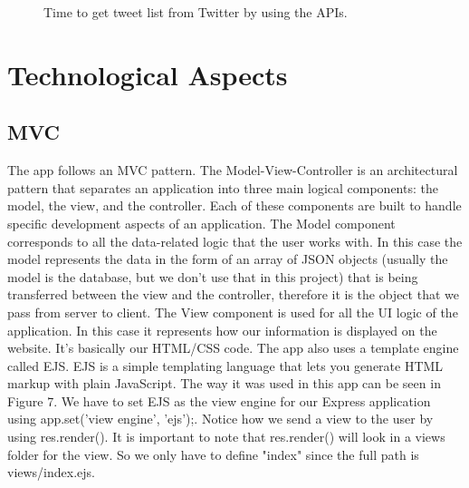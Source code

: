 \documentclass[12pt]{article} %
\begin{document}
\begin{figure}[H] %
\caption{Time to get tweet list from Twitter by using the APIs.}
\label{getStatsHTMLTime}
\end{figure}



\section{Technological Aspects} 

\subsection{MVC}
\noindent The app follows an MVC pattern. The Model-View-Controller is an architectural pattern that separates an 
application into three main logical components: the model, the view, and the controller.
 Each of these components are built to handle specific development aspects of an application.
\newline
The Model component corresponds to all the data-related logic that the user works with. In this case the model represents
the data in the form of an array of JSON objects (usually the model is the database, but we don't use that in this project) 
that is being transferred between the view and the controller, therefore it is the object that we pass
from server to client. 
\newline
The View component is used for all the UI logic of the application. In this case it represents how our information
is displayed on the website. It's basically our HTML/CSS code.
The app also uses a template engine called EJS. EJS is a simple templating language that lets you generate HTML markup with plain JavaScript.
The way it was used in this app can be seen in Figure 7.
We have to set EJS as the view engine for our Express application using app.set('view engine', 'ejs');.
Notice how we send a view to the user by using res.render(). It is important to note that res.render() will look in a views folder for the view. 
So we only have to define "index"  since the full path is views/index.ejs.
\end{document}
